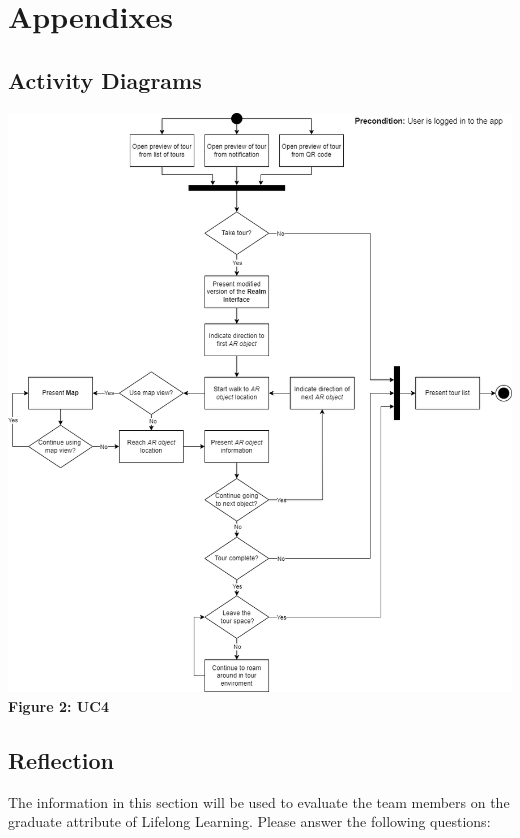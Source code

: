 \documentclass{article}
\begin{document}
\section{Appendixes}

\subsection{Activity Diagrams}
\label{sub:activity_diagrams}

\begin{center}
    \includegraphics[scale=0.4]{SequenceDiagrams/UC4.png}\\
    \textbf{Figure 2: UC4}
\end{center}

\subsection{Reflection}

The information in this section will be used to evaluate the team members on the
graduate attribute of Lifelong Learning.  Please answer the following questions:
\end{document}
